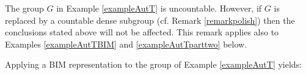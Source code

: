 
\begin{remark*}
The group $G$ in Example \ref{exampleAutT} is uncountable. However, if $G$ is replaced by a countable dense subgroup (cf. Remark \ref{remarkpolish}) then the conclusions stated above will not be affected. This remark applies also to Examples \ref{exampleAutTBIM} and \ref{exampleAutTparttwo} below.
\end{remark*}

Applying a BIM representation to the group of Example \ref{exampleAutT} yields:

